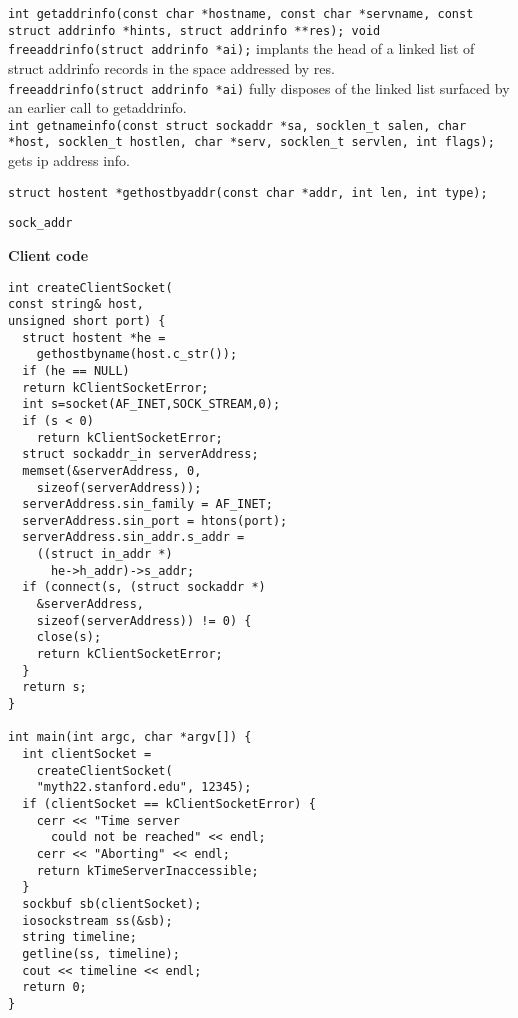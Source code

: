 \documentclass{article}
\begin{document}
\begin{multicols}{3}
  {\tt int getaddrinfo(const char *hostname, const char *servname,
  const struct addrinfo *hints, struct addrinfo **res);
  void freeaddrinfo(struct addrinfo *ai);} implants the head of a
  linked list of struct addrinfo records in the space addressed by
  res.\\
  {\tt freeaddrinfo(struct addrinfo *ai)} fully disposes of the linked list
  surfaced by an earlier call to getaddrinfo.\\
  {\tt int getnameinfo(const struct sockaddr *sa, socklen\_t salen,
  char *host, socklen\_t hostlen,
  char *serv, socklen\_t servlen, int flags);} gets ip address info.

  {\tt struct hostent *gethostbyaddr(const char *addr, int len, int type);}

  {\tt sock\_addr}

  {\bf Client code}
  \begin{verbatim}
int createClientSocket(
const string& host,
unsigned short port) {
  struct hostent *he =
    gethostbyname(host.c_str());
  if (he == NULL)
  return kClientSocketError;
  int s=socket(AF_INET,SOCK_STREAM,0);
  if (s < 0)
    return kClientSocketError;
  struct sockaddr_in serverAddress;
  memset(&serverAddress, 0,
    sizeof(serverAddress));
  serverAddress.sin_family = AF_INET;
  serverAddress.sin_port = htons(port);
  serverAddress.sin_addr.s_addr =
    ((struct in_addr *)
      he->h_addr)->s_addr;
  if (connect(s, (struct sockaddr *)
    &serverAddress,
    sizeof(serverAddress)) != 0) {
    close(s);
    return kClientSocketError;
  }
  return s;
}

int main(int argc, char *argv[]) {
  int clientSocket =
    createClientSocket(
    "myth22.stanford.edu", 12345);
  if (clientSocket == kClientSocketError) {
    cerr << "Time server
      could not be reached" << endl;
    cerr << "Aborting" << endl;
    return kTimeServerInaccessible;
  }
  sockbuf sb(clientSocket);
  iosockstream ss(&sb);
  string timeline;
  getline(ss, timeline);
  cout << timeline << endl;
  return 0;
}
  \end{verbatim}


\end{multicols}
\end{document}
